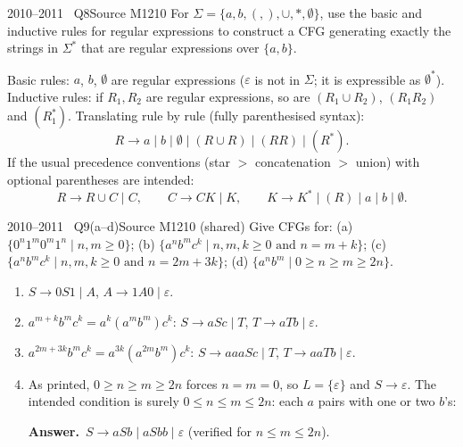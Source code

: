\documentclass[11pt,a4paper]{article}
\newcommand{\eps}{\varepsilon}
\newcommand{\ans}[1]{\par\smallskip\noindent\colorbox{mist}{\parbox{\dimexpr\linewidth-2\fboxsep}{\sffamily\small\textbf{\color{teal}Answer.}\ \color{ink}#1}}\par}
\begin{document}
\begin{question}{2010--2011 \textbullet\ Q8}{Source M12}{10}
For $\Sigma=\{a,b,(,),\cup,*,\emptyset\}$, use the basic and inductive rules for regular expressions to construct a CFG generating exactly the strings in $\Sigma^*$ that are regular expressions over $\{a,b\}$.
\end{question}
\begin{solution}
Basic rules: $a$, $b$, $\emptyset$ are regular expressions ($\eps$ is not in $\Sigma$; it is expressible as $\emptyset^*$). Inductive rules: if $R_1,R_2$ are regular expressions, so are $(R_1\cup R_2)$, $(R_1R_2)$ and $(R_1^*)$. Translating rule by rule (fully parenthesised syntax):
\[ R\to a\mid b\mid\emptyset\mid(R\cup R)\mid(RR)\mid(R^*). \]
If the usual precedence conventions (star $>$ concatenation $>$ union) with optional parentheses are intended:
\[ R\to R\cup C\mid C,\qquad C\to CK\mid K,\qquad K\to K^*\mid(R)\mid a\mid b\mid\emptyset. \]
\end{solution}

\begin{question}{2010--2011 \textbullet\ Q9(a--d)}{Source M12}{10 (shared)}
Give CFGs for: (a) $\{0^n1^m0^m1^n\mid n,m\ge0\}$; (b) $\{a^nb^mc^k\mid n,m,k\ge0 \text{ and } n=m+k\}$; (c) $\{a^nb^mc^k\mid n,m,k\ge0 \text{ and } n=2m+3k\}$; (d) $\{a^nb^m\mid 0\ge n\ge m\ge2n\}$.
\end{question}
\begin{solution}
\begin{enumerate}[label=\textbf{(\alph*)}]
\item $S\to0S1\mid A$, $A\to1A0\mid\eps$.
\item $a^{m+k}b^mc^k=a^k(a^mb^m)c^k$: $S\to aSc\mid T$, $T\to aTb\mid\eps$.
\item $a^{2m+3k}b^mc^k=a^{3k}(a^{2m}b^m)c^k$: $S\to aaaSc\mid T$, $T\to aaTb\mid\eps$.
\item As printed, $0\ge n\ge m\ge2n$ forces $n=m=0$, so $L=\{\eps\}$ and $S\to\eps$. The intended condition is surely $0\le n\le m\le2n$: each $a$ pairs with one or two $b$'s:
\ans{$S\to aSb\mid aSbb\mid\eps$ (verified for $n\le m\le 2n$).}
\end{enumerate}
\end{solution}
\end{document}
